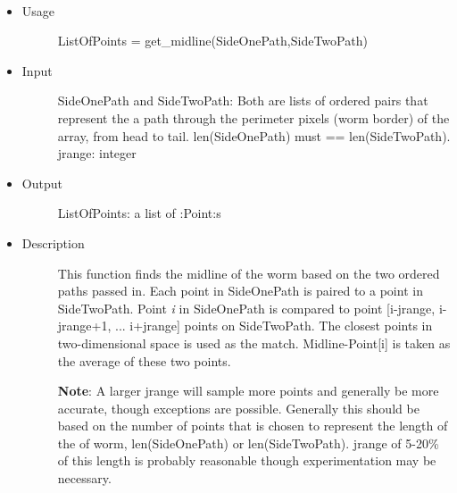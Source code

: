 \documentclass[letterpaper,10pt,oneside]{sphinxmanual}
\begin{document}
\begin{fulllineitems}
\label{index:libcelegans.get_midline}~\begin{itemize}
\item {} \begin{description}
\item[{Usage}] \leavevmode
ListOfPoints = get\_midline(SideOnePath,SideTwoPath)

\end{description}

\item {} \begin{description}
\item[{Input}] \leavevmode
SideOnePath and SideTwoPath: Both are lists of ordered pairs that represent the 
a path through the perimeter pixels (worm border) of the array, from head to tail.  
len(SideOnePath) must == len(SideTwoPath).
jrange: integer

\end{description}

\item {} \begin{description}
\item[{Output}] \leavevmode
ListOfPoints:  a list of :Point:s

\end{description}

\item {} \begin{description}
\item[{Description}] \leavevmode
This function finds the midline of the worm based on the two ordered paths
passed in.  Each point in SideOnePath is paired to a point in SideTwoPath.  
Point \emph{i} in SideOnePath is compared to point {[}i-jrange, i-jrange+1, ... i+jrange{]}
points on SideTwoPath.  The closest points in two-dimensional space is used as the
match.  Midline-Point{[}i{]} is taken as the average of these two points.

\textbf{Note}:  A larger jrange will sample more points and generally be more accurate,
though exceptions are possible.  Generally this should be based on the number of points
that is chosen to represent the length of the of worm, len(SideOnePath) or 
len(SideTwoPath).  jrange of 5-20\% of this length is probably reasonable though experimentation
may be necessary.

\end{description}

\end{itemize}

\end{fulllineitems}
\end{document}
